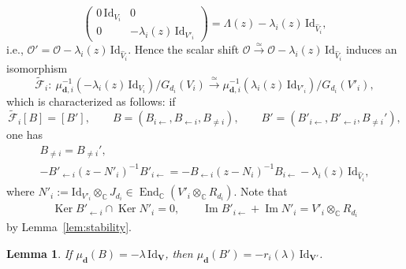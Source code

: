 \documentclass[11pt]{article}
\newcommand{\shortleftarrow}{\leftarrow}
\newcommand{\slar}{\shortleftarrow}
\numberwithin{equation}{section}
\newtheorem{Lemma}[Theorem]{Lemma}
\theoremstyle{definition}
\newcommand{\lemref}[1]{Lemma~\ref{#1}}
\newcommand{\C}{\mathbb{C}} %
\newcommand{\End}{\operatorname{End}}
\newcommand{\Ker}{\operatorname{Ker}}
\newcommand{\range}{\operatorname{Im}}
\newcommand{\unit}{\mathrm{Id}}
\newcommand{\bV}{\mathbf{V}}
\newcommand{\ved}{\mathbf{d}}
\newcommand{\bO}{\mathcal{O}}
\newcommand{\frF}{\mathscr{F}} %
\begin{document}
\[
\begin{pmatrix} 0\,\unit_{V_i} & 0 \\
0 & -\lambda_i(z)\,\unit_{V'_i} \end{pmatrix}
=\Lambda(z)-\lambda_i(z)\,\unit_{\widehat{V}_i},
\]
i.e., $\bO' = \bO - \lambda_i(z)\,\unit_{\widehat{V}_i}$.
Hence the scalar shift
$\bO \xrightarrow{\simeq} \bO - \lambda_i(z)\,\unit_{\widehat{V}_i}$
induces an isomorphism
\[
\widetilde{\frF}_i \colon \
\mu_{\ved,i}^{-1}(-\lambda_i(z)\,\unit_{V_i})/G_{d_i}(V_i) \xrightarrow{\simeq}
\mu_{\ved,i}^{-1}(\lambda_i(z)\,\unit_{V'_i})/G_{d_i}(V'_i),
\]
which is characterized as follows: if
\[
\widetilde{\frF}_i[B]=[B'], \qquad
B=(B_{i \slar},B_{\slar i},B_{\neq i}),\qquad
B' =(B'_{i \slar},B'_{\slar i},B_{\neq i}'),
\]
one has
\begin{gather}
B_{\neq i}  = B_{\neq i}', \label{eq:refrelother}\\
- B'_{\slar i}(z-N'_i)^{-1}B'_{i \slar}
 =- B_{\slar i}(z-N_i)^{-1}B_{i \slar} - \lambda_i(z)\,\unit_{\widehat{V}_i},
\label{eq:shift}
\end{gather}
where $N'_i := \unit_{V'_i} \otimes_\C J_{d_i}
\in \End_\C(V'_i \otimes_\C R_{d_i})$.
Note that
\begin{gather}\label{eq:refstability}
\Ker B'_{\slar i} \cap \Ker N'_i =0, \qquad
\range B'_{i \slar} + \range N'_i = V'_i \otimes_\C R_{d_i}
\end{gather}
by \lemref{lem:stability}.

\begin{Lemma}\label{lem:refmoment}
If $\mu_\ved(B)=-\lambda\,\unit_\bV$,
then $\mu_{\ved}(B')=-r_i(\lambda)\,\unit_{\bV'}$.
\end{Lemma}
\end{document}
